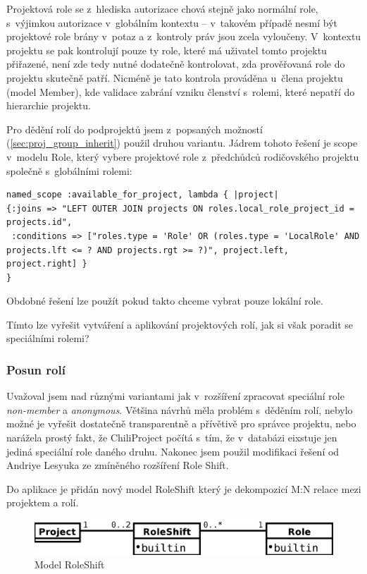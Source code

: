 \documentclass[thesis=B,czech]{FITthesis}[2012/05/02]
\begin{document}
Projektová role se z~hlediska autorizace chová stejně jako normální
role, s~výjimkou autorizace v~globálním kontextu -- v~takovém případě
nesmí být projektové role brány v~potaz a z~kontroly práv jsou zcela
vyloučeny. V~kontextu projektu se pak kontrolují pouze ty role, které má
uživatel tomto projektu přiřazené, není zde tedy nutné dodatečně
kontrolovat, zda prověřovaná role do projektu skutečně patří. Nicméně je
tato kontrola prováděna u~člena projektu (model Member), kde validace
zabrání vzniku členství s~rolemi, které nepatří do hierarchie projektu.

Pro dědění rolí do podprojektů jsem z~popsaných možností
(\ref{sec:proj_group_inherit}) použil druhou variantu. Jádrem tohoto
řešení je \gls{scope} v~modelu Role, který vybere projektové role
z~předchůdců rodičovského projektu společně s~globálními rolemi:

\begin{lstlisting}
named_scope :available_for_project, lambda { |project|
{:joins => "LEFT OUTER JOIN projects ON roles.local_role_project_id = projects.id",
 :conditions => ["roles.type = 'Role' OR (roles.type = 'LocalRole' AND projects.lft <= ? AND projects.rgt >= ?)", project.left, project.right] }
}
\end{lstlisting}
Obdobné řešení lze použít pokud takto chceme vybrat pouze lokální role.

Tímto lze vyřešit vytváření a aplikování projektových rolí, jak si však
poradit se speciálními rolemi?

\subsubsection{Posun rolí}

Uvažoval jsem nad různými variantami jak v~rozšíření zpracovat speciální
role \emph{non-member} a \emph{anonymous}. Většina návrhů měla problém
s~děděním rolí, nebylo možné je vyřešit dostatečně transparentně a
přívětivě pro správce projektu, nebo narážela prostý fakt, že
ChiliProject počítá s~tím, že v~databázi eixstuje jen jediná speciální
role daného druhu. Nakonec jsem použil modifikaci řešení od Andriye
Lesyuka ze zmíněného rozšíření Role Shift.

Do aplikace je přidán nový model RoleShift který je dekompozicí M:N
relace mezi projektem a rolí.

\begin{figure}[htbp]
\centering
\includegraphics[width=1\textwidth]{role-er2.pdf}
\caption{Model RoleShift}
\end{figure}
\end{document}
